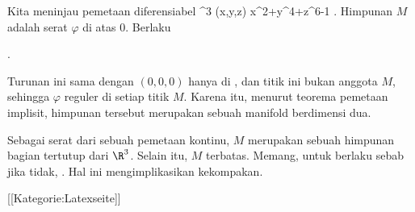 Kita meninjau pemetaan diferensiabel
\maabbeledisp {\varphi} {\R^3} {\R
} {(x,y,z)} { x^2+y^4+z^6-1
} {.}
Himpunan $M$ adalah serat $\varphi$ di atas $0$. Berlaku

 { . }

Turunan ini sama dengan $(0,0,0)$ hanya di
, dan titik ini bukan anggota $M$, sehingga $\varphi$ reguler di setiap titik $M$. Karena itu, menurut teorema pemetaan implisit, himpunan tersebut merupakan sebuah manifold berdimensi dua.

Sebagai serat dari sebuah pemetaan kontinu, $M$ merupakan sebuah himpunan bagian tertutup dari $\R^3$. Selain itu, $M$ terbatas. Memang, untuk
 berlaku
 sebab jika tidak,
. Hal ini mengimplikasikan kekompakan.

 [[Kategorie:Latexseite]]
